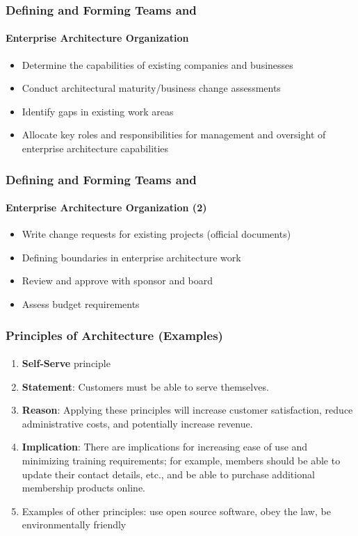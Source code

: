 \documentclass[aspectratio=169, table]{beamer}
\begin{document}
    \begin{frame}
        \frametitle{Defining and Forming Teams and}
        \framesubtitle{Enterprise Architecture Organization}
        \begin{itemize}
            \item Determine the capabilities of existing companies and businesses
            \item Conduct architectural maturity/business change assessments
            \item Identify gaps in existing work areas
            \item Allocate key roles and responsibilities for management and oversight of enterprise architecture capabilities
        \end{itemize}
    \end{frame}

    \begin{frame}
        \frametitle{Defining and Forming Teams and}
        \framesubtitle{Enterprise Architecture Organization (2)}
        \begin{itemize}
            \item Write change requests for existing projects (official documents)
            \item Defining boundaries in enterprise architecture work
            \item Review and approve with sponsor and board
            \item Assess budget requirements
        \end{itemize}
    \end{frame}


\begin{frame}
    \frametitle{Principles of Architecture (Examples)}
    \framesubtitle{\hspace{1cm}}
    \vspace{20pt}
    \begin{enumerate}
        \item \textbf{Self-Serve} principle
        \item \textbf{Statement}: Customers must be able to serve themselves.
        \item \textbf{Reason}: Applying these principles will increase customer satisfaction, reduce administrative costs, and potentially increase revenue.
        \item \textbf{Implication}: There are implications for increasing ease of use and minimizing training requirements; for example, members should be able to update their contact details, etc., and be able to purchase additional membership products online.
        \item Examples of other principles: use open source software, obey the law, be environmentally friendly
    \end{enumerate}
\end{frame}
\end{document}

